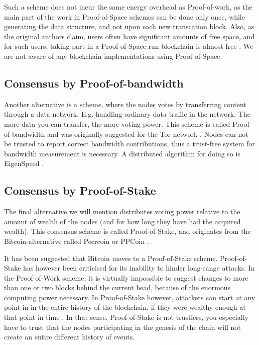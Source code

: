 \documentclass[oneside,a4paper,10pts,article]{memoir}
\begin{document}
Such a scheme does not incur the same energy overhead as
Proof-of-work, as the main part of the work in Proof-of-Space schemes
can be done only once, while generating the data structure, and not
upon each new transcation block. Also, as the original authors claim,
users often have significant amounts of free space, and for such
users, taking part in a Proof-of-Space run blockchain is almost free
\cite{dziembowski2015proofs}. We are not aware of any blockchain
implementations using Proof-of-Space.

\subsection{Consensus by Proof-of-bandwidth}
Another alternative is a scheme, where the nodes votes by transferring
content through a data-network. E.g. handling ordinary data traffic in
the network. The more data you can transfer, the more voting
power. This scheme is called Proof-of-bandwidth and was originally
suggested for the Tor-network \cite{ghosh2014torpath}. Nodes can not
be trusted to report correct bandwidth contributions, thus a
trust-free system for bandwidth measurement is necessary. A
distributed algorithm for doing so is EigenSpeed
\cite{snader2009eigenspeed}.

\subsection{Consensus by Proof-of-Stake}
The final alternative we will mention distributes voting power
relative to the amount of wealth of the nodes (and for how long they
have had the acquired wealth). This consensus scheme is called
Proof-of-Stake, and originates from the Bitcoin-alternative called
Peercoin or PPCoin \cite{king2012ppcoin}.

It has been suggested that Bitcoin moves to a Proof-of-Stake scheme.
Proof-of-Stake has however been criticised for its inability to hinder
long-range attacks. In the Proof-of-Work scheme, it is virtually
impossible to suggest changes to more than one or two blocks behind
the current head, because of the enormous computing power
necessary. In Proof-of-Stake however, attackers can start at any point
in in the entire history of the blockchain, if they were wealthy
enough at that point in time \cite{buterin2014onstake}. In that sense,
Proof-of-Stake is not trustless, you especially have to trust that the
nodes participating in the genesis of the chain will not create an
entire different history of events.
\end{document}
